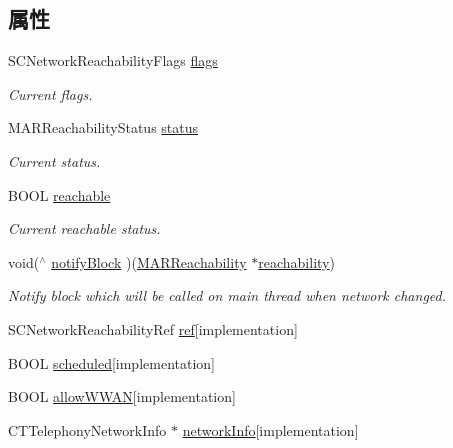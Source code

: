\subsection*{属性}
\begin{DoxyCompactItemize}
\item 
S\+C\+Network\+Reachability\+Flags \hyperlink{interface_m_a_r_reachability_a5609e9b8862a463872d79be768d5c75c}{flags}
\begin{DoxyCompactList}\small\item\em Current flags. \end{DoxyCompactList}\item 
M\+A\+R\+Reachability\+Status \hyperlink{interface_m_a_r_reachability_a016228b173329e79b0857ca50c29ddc8}{status}
\begin{DoxyCompactList}\small\item\em Current status. \end{DoxyCompactList}\item 
B\+O\+OL \hyperlink{interface_m_a_r_reachability_a423d1d55fdbc1866c41bcaaf433aa982}{reachable}
\begin{DoxyCompactList}\small\item\em Current reachable status. \end{DoxyCompactList}\item 
void($^\wedge$ \hyperlink{interface_m_a_r_reachability_a139ed1358b13ec8fa7386ff02b611cdb}{notify\+Block} )(\hyperlink{interface_m_a_r_reachability}{M\+A\+R\+Reachability} $\ast$\hyperlink{interface_m_a_r_reachability_ad46b6909f162c589339d3a22b72d056d}{reachability})
\begin{DoxyCompactList}\small\item\em Notify block which will be called on main thread when network changed. \end{DoxyCompactList}\item 
S\+C\+Network\+Reachability\+Ref \hyperlink{interface_m_a_r_reachability_a9c8a836f1b3f522197e8499e233a177a}{ref}{\ttfamily  \mbox{[}implementation\mbox{]}}
\item 
B\+O\+OL \hyperlink{interface_m_a_r_reachability_a762a351206245fb37b72f2e043c72a31}{scheduled}{\ttfamily  \mbox{[}implementation\mbox{]}}
\item 
B\+O\+OL \hyperlink{interface_m_a_r_reachability_a19f1023342e583c6c42ab685098801a8}{allow\+W\+W\+AN}{\ttfamily  \mbox{[}implementation\mbox{]}}
\item 
C\+T\+Telephony\+Network\+Info $\ast$ \hyperlink{interface_m_a_r_reachability_a0a578dd8e75987a6a245834b48bd50b5}{network\+Info}{\ttfamily  \mbox{[}implementation\mbox{]}}
\end{DoxyCompactItemize}


